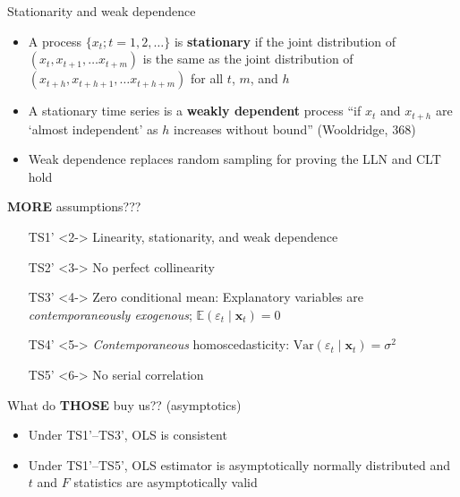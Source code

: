 \documentclass[
  ignorenonframetext,
]{beamer}
\providecommand{\tightlist}{%
  \setlength{\itemsep}{0pt}\setlength{\parskip}{0pt}}
\newcommand{\setsep}{\setlength{\itemsep}{3pt}}
\newcommand{\setskip}{\setlength{\parskip}{3pt}}
\renewcommand{\tightlist}{\setsep\setskip}
\begin{document}
\begin{frame}{Stationarity and weak dependence}
\protect\hypertarget{stationarity-and-weak-dependence}{}
\pause

\begin{itemize}[<+->]
\tightlist
\item
  A process \(\{x_t; t = 1, 2, \dots\}\) is \textbf{stationary} if the joint distribution of \(\left(x_t, x_{t+1}, \dots x_{t + m}\right)\) is the same as the joint distribution of \(\left(x_{t+h}, x_{t+h+1}, \dots x_{t+h + m}\right)\) for all \(t\), \(m\), and \(h\)
\item
  A stationary time series is a \textbf{weakly dependent} process ``if \(x_t\) and \(x_{t+h}\) are `almost independent' as \(h\) increases without bound'' (Wooldridge, 368)
\item
  Weak dependence replaces random sampling for proving the LLN and CLT hold
\end{itemize}
\end{frame}

\begin{frame}{\textbf{MORE} assumptions???}
\protect\hypertarget{more-assumptions-1}{}
\begin{itemize}
    \setlength{\itemsep}{3pt}\setlength{\parskip}{3pt}
    \item[TS1']<2-> Linearity, stationarity, and weak dependence
    \item[TS2']<3-> No perfect collinearity
    \item[TS3']<4-> Zero conditional mean: Explanatory variables are \textit{contemporaneously exogenous}; $\mathbb{E}\left(\varepsilon_t\mid\mathbf{x}_t\right) = 0$
    \item[TS4']<5-> \textit{Contemporaneous} homoscedasticity: $\text{Var}\left(\varepsilon_t\mid\mathbf{x}_t\right) = \sigma^2$
    \item[TS5']<6-> No serial correlation
\end{itemize}
\end{frame}

\begin{frame}{What do \textbf{THOSE} buy us?? (asymptotics)}
\protect\hypertarget{what-do-those-buy-us-asymptotics}{}
\pause

\begin{itemize}[<+->]
\tightlist
\item
  Under TS1'--TS3', OLS is consistent
\item
  Under TS1'--TS5', OLS estimator is asymptotically normally distributed and \(t\) and \(F\) statistics are asymptotically valid
\end{itemize}
\end{frame}
\end{document}

